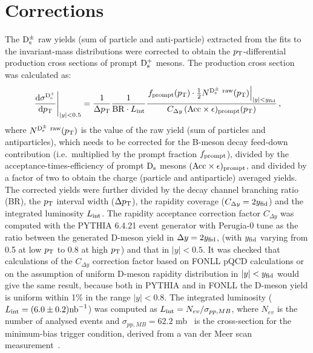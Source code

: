 \section{Corrections}
\label{sec:corrPP}
The ${\rm D_s^{\pm}}$ raw yields (sum of particle and anti-particle) extracted from the fits to the invariant-mass distributions
were corrected to obtain the $p_{\rm T}$-differential production cross sections of prompt
 ${\rm D_s^+}$ mesons. The production cross section was calculated as:
\begin{equation}
  \label{eq:dsdpt}
  \left.\frac{{\rm d} \sigma^{\rm D^{+}_{\rm s}}}{{\rm d}p_{\rm T}}\right|_{|y|<0.5}=
  \frac{1}{ \Delta p_{\rm T}}\frac{1}{{\rm BR} \cdot L_{\rm int}}\frac{\left.f_{\rm prompt}(p_{\rm T})\cdot \frac{1}{2} N^{\rm D^\pm_{\rm s}~raw}(p_{\rm T})\right|_{|y|<y_{\rm fid}}}{ C_{\Delta y} \,({\rm Acc}\times\epsilon)_{\rm prompt}(p_{\rm T})}\,,
\end{equation}
where $N^{\rm D^\pm_{\rm s}~raw}(p_{\rm T})$ is the value of the raw yield 
(sum of particles and antiparticles),
 which needs to be corrected for the B-meson decay feed-down contribution 
(i.e.\ multiplied by the prompt fraction $f_{\rm{prompt}}$), divided by the 
acceptance-times-efficiency of prompt ${\rm D_s}$ mesons 
$(\rm Acc \times \epsilon)_{\rm{prompt}}$, and divided by a factor of two to 
obtain the charge (particle and antiparticle) averaged yields.
The corrected yields were further divided by the decay channel branching ratio (BR), 
the $p_{\rm T}$ interval width ($\Delta p_{\rm T}$), the rapidity coverage 
($C_{\Delta y} = 2 y_{\rm fid}$) and the integrated luminosity $L_{\rm int}$.
The rapidity acceptance correction factor $C_{\Delta y}$ was computed with the PYTHIA 6.4.21 event generator
with Perugia-0 tune as the ratio between the generated D-meson yield in $\Delta y = 2y_{\rm fid}$, 
(with $y_{\rm fid}$ varying from 0.5 at low $p_{\rm T}$ to 0.8 at high $p_{\rm T}$) 
and that in $|y| < 0.5$. It was checked that calculations of the $C_{\Delta y}$ correction 
factor based on FONLL pQCD calculations or on the assumption of uniform D-meson
rapidity distribution in $|y| < y_{\rm fid}$ would give the same result, 
because both in PYTHIA and in FONLL the D-meson yield is uniform within 1\% in the range $|y| < 0.8$.
The integrated luminosity ($L_{\rm int} = (6.0 \pm 0.2) {\rm nb}^{-1}$) was computed as $L_{\rm int} = N_{ev}/\sigma_{pp,MB}$,
where $N_{ev}$ is the number of analysed events and 
$\sigma_{pp,MB} = 62.2$ mb~\cite{Abelev:2012sea}
is the cross-section for the minimum-bias trigger condition, derived from
a van der Meer scan measurement~\cite{vanderMeer:296752}.

